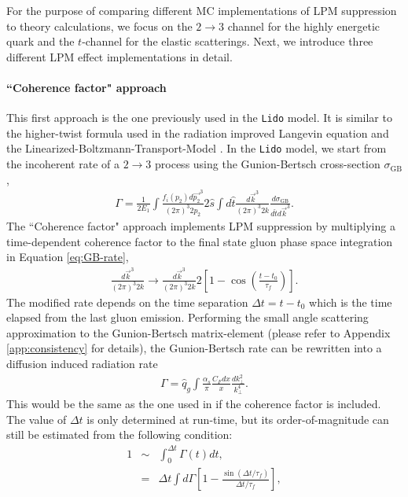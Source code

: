 \documentclass[aps, prc, reprint, amsmath, groupedaddress, nofootinbib]{revtex4-1}
\begin{document}
For the purpose of comparing different MC implementations of LPM suppression to theory calculations, we focus on the $2\rightarrow 3$ channel for the highly energetic quark and the $t$-channel for the elastic scatterings.
Next, we introduce three different LPM effect implementations in detail.

\paragraph*{``Coherence factor" approach} This first approach is the one previously used in the {\tt Lido} model. 
It is similar to the higher-twist formula used in the radiation improved Langevin equation \cite{Cao:2013ita} and the Linearized-Boltzmann-Transport-Model \cite{Cao:2016gvr,Cao:2017hhk}.
In the {\tt Lido} model, we start from the incoherent rate of a $2\rightarrow 3$ process using the Gunion-Bertsch cross-section $\sigma_\textrm{GB}$,
\begin{eqnarray}\label{eq:GB-rate}
\Gamma = \frac{1}{2E_1}\int\frac{f_i(p_2)d\vec{p_2}^3}{(2\pi)^3 2p_2}2\hat{s}\int d\hat{t}\frac{d\vec{k}^3}{(2\pi)^3 2k}\frac{d\sigma_{\textrm{GB}}}{d\hat{t}d\vec{k}^3}.
\end{eqnarray}
The ``Coherence factor" approach implements LPM suppression by multiplying a time-dependent coherence factor to the final state gluon phase space integration in Equation \ref{eq:GB-rate},
\begin{eqnarray}\label{eq:GB-rate-LPM}
\frac{d\vec{k}^3}{(2\pi)^3 2k} \rightarrow \frac{d\vec{k}^3}{(2\pi)^3 2k} 2\left[1-\cos\left(\frac{t-t_0}{\tau_f}\right)\right].
\end{eqnarray}
The modified rate depends on the time separation $\Delta t = t-t_0$ which is the time elapsed from the last gluon emission.
Performing the small angle scattering approximation to the Gunion-Bertsch matrix-element (please refer to Appendix \ref{app:consistency} for details), the Gunion-Bertsch rate can be rewritten into a diffusion induced radiation rate
\begin{eqnarray}\label{eq:GB-small-angle-rate}
\Gamma = \hat{q}_g\int\frac{\alpha_s}{\pi}\frac{C_F dx}{x} \frac{dk_\perp^2}{k_\perp^4}.
\end{eqnarray}
This would be the same as the one used in \cite{Cao:2013ita} if the coherence factor is included.
The value of $\Delta t$ is only determined at run-time,
but its order-of-magnitude can still be estimated  from the following condition:
\begin{eqnarray}\label{eq:delta-t-1}
\nonumber
1 &\sim& \int_0^{\Delta t}\Gamma(t) dt,\\
&=& \Delta t \int d\Gamma \left[1-\frac{\sin(\Delta t/\tau_f)}{\Delta t/\tau_f}\right],
\end{eqnarray}
\end{document}
